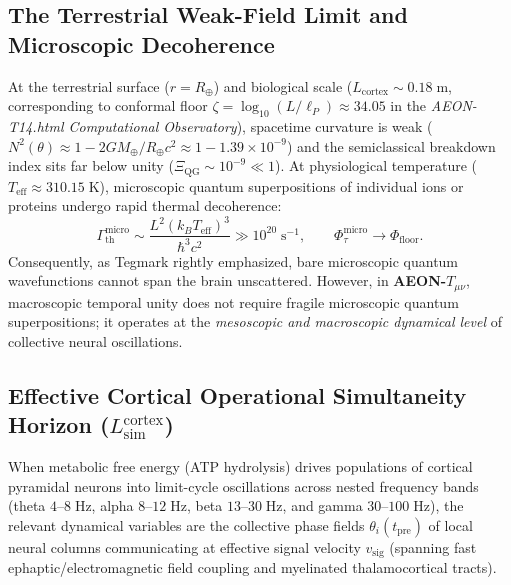 \documentclass[11pt,a4paper]{article}
\begin{document}
\subsection{The Terrestrial Weak-Field Limit and Microscopic Decoherence}
At the terrestrial surface ($r = R_\oplus$) and biological scale ($L_{\mathrm{cortex}} \sim 0.18\;\mathrm{m}$, corresponding to conformal floor $\zeta = \log_{10}(L/\ell_P) \approx 34.05$ in the \emph{AEON-T14.html Computational Observatory}), spacetime curvature is weak ($N^2(\theta) \approx 1 - 2GM_\oplus/R_\oplus c^2 \approx 1 - 1.39 \times 10^{-9}$) and the semiclassical breakdown index sits far below unity ($\Xi_{\mathrm{QG}} \sim 10^{-9} \ll 1$). At physiological temperature ($T_{\mathrm{eff}} \approx 310.15\;\mathrm{K}$), microscopic quantum superpositions of individual ions or proteins undergo rapid thermal decoherence:
\begin{equation}
    \Gamma_{\mathrm{th}}^{\mathrm{micro}} \sim \frac{L^2 (k_B T_{\mathrm{eff}})^3}{\hbar^3 c^2} \gg 10^{20}\;\mathrm{s}^{-1}, \qquad \Phi_\tau^{\mathrm{micro}} \to \Phi_{\mathrm{floor}}.
\end{equation}
Consequently, as Tegmark \cite{tegmark2000} rightly emphasized, bare microscopic quantum wavefunctions cannot span the brain unscattered. However, in \textbf{AEON-$T_{\mu\nu}$}, macroscopic temporal unity does not require fragile microscopic quantum superpositions; it operates at the \emph{mesoscopic and macroscopic dynamical level} of collective neural oscillations.

\subsection{Effective Cortical Operational Simultaneity Horizon ($L_{\mathrm{sim}}^{\mathrm{cortex}}$)}
When metabolic free energy (ATP hydrolysis) drives populations of cortical pyramidal neurons into limit-cycle oscillations across nested frequency bands (theta $4$--$8\;\mathrm{Hz}$, alpha $8$--$12\;\mathrm{Hz}$, beta $13$--$30\;\mathrm{Hz}$, and gamma $30$--$100\;\mathrm{Hz}$), the relevant dynamical variables are the collective phase fields $\theta_i(t_{\mathrm{pre}})$ of local neural columns communicating at effective signal velocity $v_{\mathrm{sig}}$ (spanning fast ephaptic/electromagnetic field coupling and myelinated thalamocortical tracts).
\end{document}
